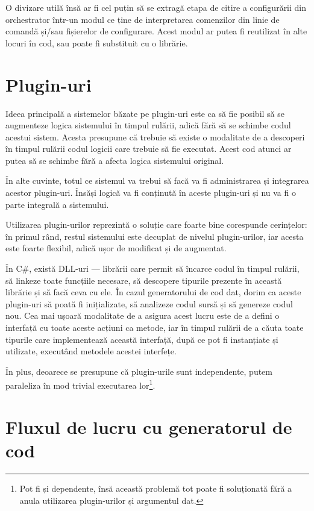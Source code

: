 \documentclass[a4paper,12pt]{report}
\begin{document}
O divizare utilă însă ar fi cel puțin să se extragă etapa de citire a configurării din orchestrator într-un modul ce ține de interpretarea comenzilor din linie de comandă și/sau fișierelor de configurare.
Acest modul ar putea fi reutilizat în alte locuri în cod, sau poate fi substituit cu o librărie.

\section{Plugin-uri}

Ideea principală a sistemelor băzate pe plugin-uri este ca să fie posibil să se augmenteze logica sistemului în timpul rulării, adică fără să se schimbe codul acestui sistem.
Acesta presupune că trebuie să existe o modalitate de a descoperi în timpul rulării codul logicii care trebuie să fie executat.
Acest cod atunci ar putea să se schimbe fără a afecta logica sistemului original.

În alte cuvinte, totul ce sistemul va trebui să facă va fi administrarea și integrarea acestor plugin-uri.
Însăși logică va fi conținută în aceste plugin-uri și nu va fi o parte integrală a sistemului.

Utilizarea plugin-urilor reprezintă o soluție care foarte bine corespunde cerințelor: în primul rând, restul sistemului este decuplat de nivelul plugin-urilor, iar acesta este foarte flexibil, adică ușor de modificat și de augmentat.

În C\#, există \ac{DLL}-uri --- librării care permit să încarce codul în timpul rulării, să linkeze toate funcțiile necesare, să descopere tipurile prezente în această librărie și să facă ceva cu ele.
În cazul generatorului de cod dat, dorim ca aceste plugin-uri să poată fi inițializate, să analizeze codul sursă și să genereze codul nou.
Cea mai ușoară modalitate de a asigura acest lucru este de a defini o interfață cu toate aceste acțiuni ca metode, iar în timpul rulării de a căuta toate tipurile care implementează această interfață, după ce pot fi instanțiate și utilizate, executând metodele acestei interfețe. 

În plus, deoarece se presupune că plugin-urile sunt independente, putem paraleliza în mod trivial executarea lor\footnote{Pot fi și dependente, însă această problemă tot poate fi soluționată fără a anula utilizarea plugin-urilor și argumentul dat.}.

\section{Fluxul de lucru cu generatorul de cod}
\end{document}
